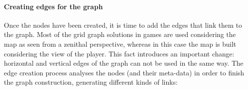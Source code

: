 \documentclass[conference]{IEEEtran}
\begin{document}
\paragraph{Creating edges for the graph}

Once the nodes have been created, it is time to add the edges that link them to the graph.
Most of the grid graph solutions in games are used considering the map as seen from 
a zenithal perspective, whereas in this case the map is built considering the view of the 
player. This fact introduces an important change: horizontal
and vertical edges of the graph can not be used in the same way.
The edge creation process analyses the nodes (and their meta-data) in order to finish
the graph construction, generating different kinds of links:
\end{document}

